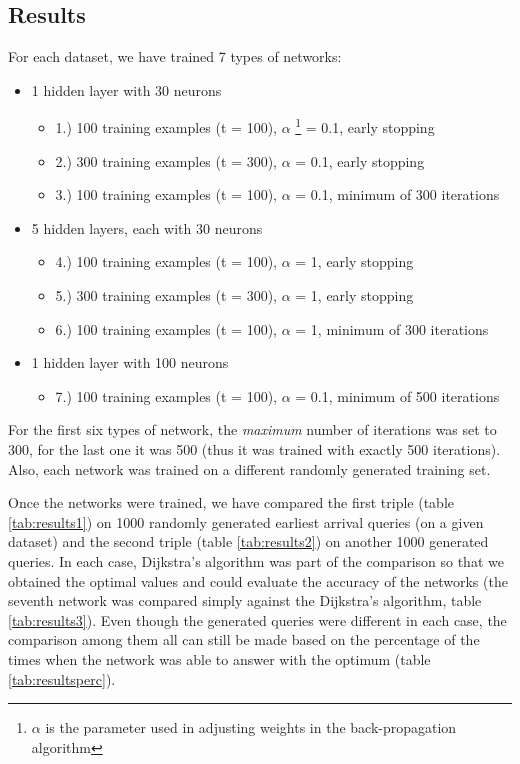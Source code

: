 \subsection{Results}
	
	For each dataset, we have trained 7 types of networks:
	\begin{itemize}
		\item 1 hidden layer with 30 neurons
		\begin{itemize}
			\item 1.) 100 training examples (t = 100), $\alpha$ \footnote{$\alpha$ is the parameter used in adjusting weights in the back-propagation algorithm} = 0.1, early stopping
			\item 2.) 300 training examples (t = 300), $\alpha$ = 0.1, early stopping
			\item 3.) 100 training examples (t = 100), $\alpha$ = 0.1, minimum of 300 iterations
		\end{itemize}
		\item 5 hidden layers, each with 30 neurons
		\begin{itemize}
			\item 4.) 100 training examples (t = 100), $\alpha$ = 1, early stopping
			\item 5.) 300 training examples (t = 300), $\alpha$ = 1, early stopping
			\item 6.) 100 training examples (t = 100), $\alpha$ = 1, minimum of 300 iterations
		\end{itemize}
		\item 1 hidden layer with 100 neurons
		\begin{itemize}
			\item 7.) 100 training examples (t = 100), $\alpha$ = 0.1, minimum of 500 iterations
		\end{itemize}
	\end{itemize}
	\hspace{\fill}
	
	\noindent For the first six types of network, the \textit{maximum} number of iterations was set to 300, for the last one it was 500 (thus it was trained with exactly 500 iterations). Also, each network was trained on a different randomly generated training set. 
	
	Once the networks were trained, we have compared the first triple (table \ref{tab:results1}) on 1000 randomly generated earliest arrival queries (on a given dataset) and the second triple (table \ref{tab:results2}) on another 1000 generated queries. In each case, Dijkstra's algorithm was part of the comparison so that we obtained the optimal values and could evaluate the accuracy of the networks (the seventh network was compared simply against the Dijkstra's algorithm, table \ref{tab:results3}). Even though the generated queries were different in each case, the comparison among them all can still be made based on the percentage of the times when the network was able to answer with the optimum (table \ref{tab:resultsperc}).
    
